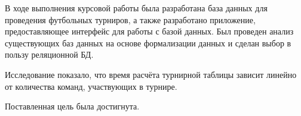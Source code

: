 \conclusion

В ходе выполнения курсовой работы была разработана база данных для проведения футбольных турниров, а также разработано приложение, предоставляющее интерфейс для работы с базой данных. Был проведен анализ существующих баз данных на основе формализации
данных и сделан выбор в пользу реляционной БД.

Исследование показало, что время расчёта турнирной таблицы зависит линейно от количества команд, участвующих в турнире.

Поставленная цель была достигнута.